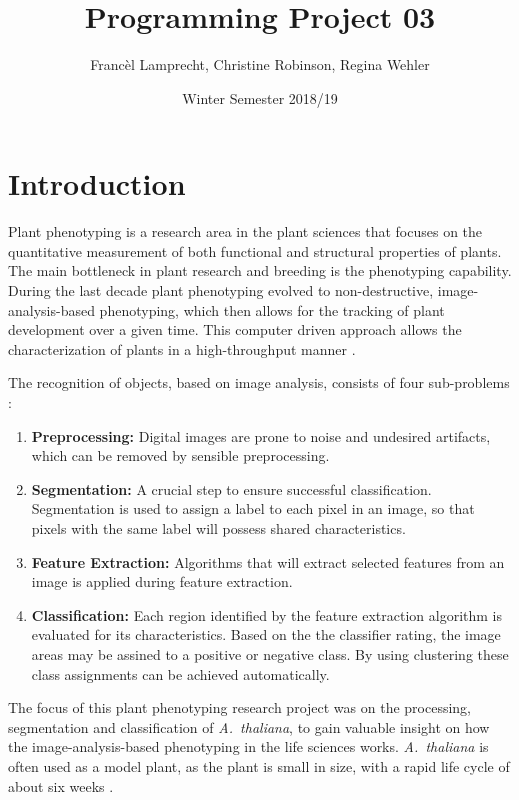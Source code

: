 \documentclass[paper=A4,bibliography=totocnumbered]{scrartcl}
\title{Programming Project 03}
\author{Francèl Lamprecht, Christine Robinson, Regina Wehler}
\date{Winter Semester 2018/19}
\begin{document}
\maketitle

\tableofcontents
\clearpage
\section{Introduction}
Plant phenotyping is a research  area in the plant sciences that focuses on the quantitative measurement of both functional and structural properties of plants. The main bottleneck in plant research and breeding is the phenotyping capability. During the last decade plant phenotyping evolved to non-destructive, image-analysis-based phenotyping, which then allows for the tracking of plant development over a given time. This computer driven approach allows the characterization of plants in a high-throughput manner \citep{Walter.2015}.

The recognition of objects, based on image analysis, consists of four sub-problems \citep{Adams.2018}: 
\begin{enumerate}
\item \textbf{Preprocessing:} Digital images are prone to noise and undesired artifacts, which can be removed by sensible preprocessing. 
\item \textbf{Segmentation:}  A crucial step to ensure successful classification. Segmentation is used to assign a label to each pixel in an image, so that pixels with the same label will possess shared characteristics. 
\item \textbf{Feature Extraction:}  Algorithms that will extract selected features from an image is applied during feature extraction. 
\item \textbf{Classification:}  Each region identified by the feature extraction algorithm is evaluated for its characteristics. Based on the the classifier rating, the image areas may be assined to  a positive or negative class. By using clustering these class assignments can be achieved automatically. 
\end{enumerate}

The focus of this plant phenotyping research project was on the processing, segmentation and classification of \textit{A.~thaliana}, to gain valuable insight on how the image-analysis-based phenotyping in the life sciences works. \textit{A.~thaliana} is often used as a model plant, as the plant is small in size, with a rapid life cycle of about six weeks \citep{Koornneef.2010}. 
\end{document}
